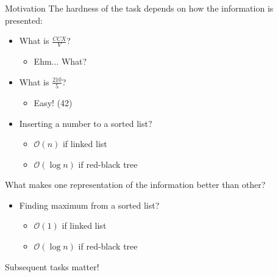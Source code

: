 \begin{frame}{Motivation}
The hardness of the task depends on how the information is presented:
\begin{itemize}
\item What is $\frac{CCX}{V}$?
\begin{itemize}
\item Ehm... What?
\end{itemize}
\item What is $\frac{210}{5}$?
\begin{itemize}
\item Easy! (42)
\end{itemize}
\item Inserting a number to a sorted list?
\begin{itemize}
\item $\mathcal{O}(n)$ if linked list
\item $\mathcal{O}(\log n)$ if red-black tree
\end{itemize}
\end{itemize}

\end{frame}

\begin{frame}
What makes one representation of the information better than other?
\begin{itemize}
\item Finding maximum from a sorted list?
\begin{itemize}
\item $\mathcal{O}(1)$ if linked list
\item $\mathcal{O}(\log n)$ if red-black tree
\end{itemize}
\end{itemize}
Subsequent tasks matter!
\end{frame}